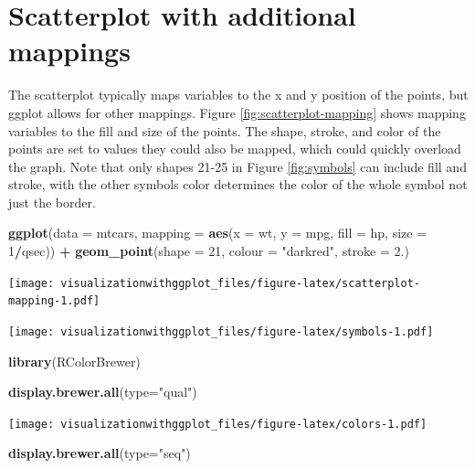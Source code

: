 \documentclass[]{krantz}
\makeatletter
\newenvironment{Shaded}{\begin{snugshade}}{\end{snugshade}}
\newcommand{\DataTypeTok}[1]{\textcolor[rgb]{0.13,0.29,0.53}{#1}}
\newcommand{\DecValTok}[1]{\textcolor[rgb]{0.00,0.00,0.81}{#1}}
\newcommand{\FloatTok}[1]{\textcolor[rgb]{0.00,0.00,0.81}{#1}}
\newcommand{\KeywordTok}[1]{\textcolor[rgb]{0.13,0.29,0.53}{\textbf{#1}}}
\newcommand{\NormalTok}[1]{#1}
\newcommand{\OperatorTok}[1]{\textcolor[rgb]{0.81,0.36,0.00}{\textbf{#1}}}
\newcommand{\StringTok}[1]{\textcolor[rgb]{0.31,0.60,0.02}{#1}}
\newenvironment{kframe}{%
\medskip{}
\setlength{\fboxsep}{.8em}
 \def\at@end@of@kframe{}%
 \ifinner\ifhmode%
  \def\at@end@of@kframe{\end{minipage}}%
  \begin{minipage}{\columnwidth}%
 \fi\fi%
 \def\FrameCommand##1{\hskip\@totalleftmargin \hskip-\fboxsep
 \colorbox{shadecolor}{##1}\hskip-\fboxsep
     \hskip-\linewidth \hskip-\@totalleftmargin \hskip\columnwidth}%
 \MakeFramed {\advance\hsize-\width
   \@totalleftmargin\z@ \linewidth\hsize
   \@setminipage}}%
 {\par\unskip\endMakeFramed%
 \at@end@of@kframe}
\renewenvironment{Shaded}{\begin{kframe}}{\end{kframe}}
\makeatother
\begin{document}
\hypertarget{scatterplot-with-additional-mappings}{%
\section{Scatterplot with additional mappings}\label{scatterplot-with-additional-mappings}}

The scatterplot typically maps variables to the x and y position of the points, but ggplot allows for other mappings. Figure \ref{fig:scatterplot-mapping} shows mapping variables to the fill and size of the points. The shape, stroke, and color of the points are set to values they could also be mapped, which could quickly overload the graph. Note that only shapes 21-25 in Figure \ref{fig:symbols} can include fill and stroke, with the other symbols color determines the color of the whole symbol not just the border.

\begin{Shaded}
\begin{Highlighting}[]
\KeywordTok{ggplot}\NormalTok{(}\DataTypeTok{data =}\NormalTok{ mtcars, }\DataTypeTok{mapping =} \KeywordTok{aes}\NormalTok{(}\DataTypeTok{x =}\NormalTok{ wt, }\DataTypeTok{y =}\NormalTok{ mpg, }\DataTypeTok{fill =}\NormalTok{ hp, }\DataTypeTok{size =} \DecValTok{1}\OperatorTok{/}\NormalTok{qsec)) }\OperatorTok{+}\StringTok{ }
\StringTok{  }\KeywordTok{geom_point}\NormalTok{(}\DataTypeTok{shape =} \DecValTok{21}\NormalTok{, }\DataTypeTok{colour =} \StringTok{"darkred"}\NormalTok{, }\DataTypeTok{stroke =} \FloatTok{2.}\NormalTok{) }
\end{Highlighting}
\end{Shaded}

\texttt{[image: visualizationwithggplot\_files/figure-latex/scatterplot-mapping-1.pdf]}

\texttt{[image: visualizationwithggplot\_files/figure-latex/symbols-1.pdf]}

\begin{Shaded}
\begin{Highlighting}[]
\KeywordTok{library}\NormalTok{(RColorBrewer)}

\KeywordTok{display.brewer.all}\NormalTok{(}\DataTypeTok{type=}\StringTok{"qual"}\NormalTok{)}
\end{Highlighting}
\end{Shaded}

\texttt{[image: visualizationwithggplot\_files/figure-latex/colors-1.pdf]}

\begin{Shaded}
\begin{Highlighting}[]
\KeywordTok{display.brewer.all}\NormalTok{(}\DataTypeTok{type=}\StringTok{"seq"}\NormalTok{)}
\end{Highlighting}
\end{Shaded}
\end{document}
